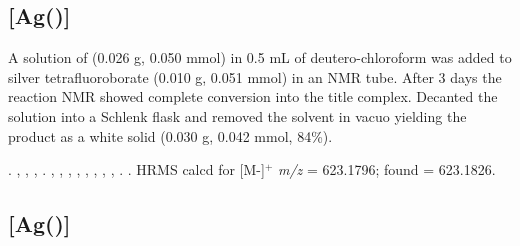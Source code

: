 

\subsection*{\texorpdfstring{[Ag(\tButhixantphos)]} A}


A solution of \tButhixantphos{} (0.026 g, 0.050 mmol) in 0.5 mL of deutero-chloroform was added to silver tetrafluoroborate (0.010 g, 0.051 mmol) in an NMR tube.  After 3 days the reaction NMR showed complete conversion into the title complex.  Decanted the solution into a Schlenk flask and removed the solvent in vacuo yielding the product as a white solid (0.030 g, 0.042 mmol, 84\%).

.
,
,
,
.
,
,
,
,
,
, %
,
,
.
.
HRMS calcd for  [M-]$^+$ \emph{m/z} = 623.1796; found = 623.1826.


\subsection*{\texorpdfstring{[Ag(\tBuxantphos)]} A} %


